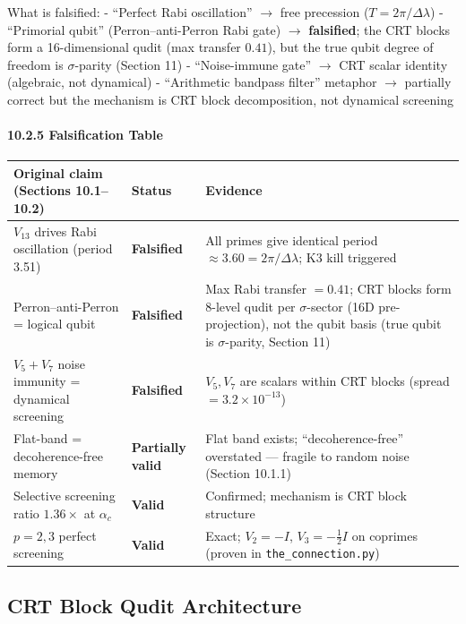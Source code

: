 \documentclass[11pt,letterpaper]{article}
\theoremstyle{definition}
\theoremstyle{remark}
\begin{document}
What is falsified: - ``Perfect Rabi oscillation'' $\to$ free precession ($T = 2\pi/\Delta\lambda$) - ``Primorial qubit'' (Perron--anti-Perron Rabi gate) $\to$ \textbf{falsified}; the CRT blocks form a 16-dimensional qudit (max transfer $0.41$), but the true qubit degree of freedom is $\sigma$-parity (Section 11) - ``Noise-immune gate'' $\to$ CRT scalar identity (algebraic, not dynamical) - ``Arithmetic bandpass filter'' metaphor $\to$ partially correct but the mechanism is CRT block decomposition, not dynamical screening

\paragraph{10.2.5 Falsification Table}\label{falsification-table}

\begin{longtable}[]{@{}
  >{\raggedright\arraybackslash}p{}
  >{\raggedright\arraybackslash}p{}
  >{\raggedright\arraybackslash}p{}@{}}
\toprule
Original claim (Sections 10.1--10.2) & Status & Evidence \\
\midrule
\endhead
\bottomrule
$V_{13}$ drives Rabi oscillation (period 3.51) & \textbf{Falsified} & All primes give identical period $\approx 3.60 = 2\pi/\Delta\lambda$; K3 kill triggered \\
Perron--anti-Perron = logical qubit & \textbf{Falsified} & Max Rabi transfer $= 0.41$; CRT blocks form 8-level qudit per $\sigma$-sector (16D pre-projection), not the qubit basis (true qubit is $\sigma$-parity, Section 11) \\
$V_5 + V_7$ noise immunity = dynamical screening & \textbf{Falsified} & $V_5, V_7$ are scalars within CRT blocks (spread $= 3.2 \times 10^{-13}$) \\
Flat-band = decoherence-free memory & \textbf{Partially valid} & Flat band exists; ``decoherence-free'' overstated --- fragile to random noise (Section 10.1.1) \\
Selective screening ratio $1.36\times$ at $\alpha_c$ & \textbf{Valid} & Confirmed; mechanism is CRT block structure \\
$p = 2, 3$ perfect screening & \textbf{Valid} & Exact; $V_2 = -I$, $V_3 = -\tfrac{1}{2}I$ on coprimes (proven in \texttt{the\_connection.py}) \\
\end{longtable}

\subsection{CRT Block Qudit Architecture}\label{crt-block-qudit-architecture}
\end{document}
